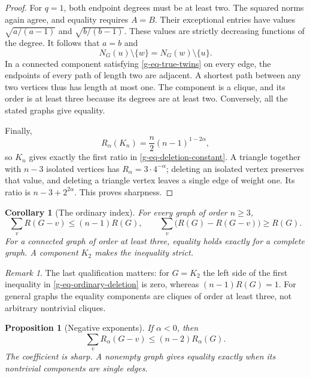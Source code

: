 \documentclass[11pt,a4paper]{article}
\newtheorem{proposition}[theorem]{Proposition}
\newtheorem{corollary}[theorem]{Corollary}
\theoremstyle{definition}
\theoremstyle{remark}
\newtheorem{remark}[theorem]{Remark}
\begin{document}
\begin{proof}
For $q=1$, both endpoint degrees must be at least two.  The squared norms
again agree, and equality requires $A=B$.  Their exceptional entries have
values $\sqrt{a/(a-1)}$ and $\sqrt{b/(b-1)}$.  These values are strictly
decreasing functions of the degree.  It follows that $a=b$ and
\begin{equation}
 N_G(u)\setminus\{w\}=N_G(w)\setminus\{u\}.
 \label{g-eq-true-twins}
\end{equation}
In a connected component satisfying \eqref{g-eq-true-twins} on every edge,
the endpoints of every path of length two are adjacent.  A shortest path
between any two vertices thus has length at most one.  The component is a
clique, and its order is at least three because its degrees are at least
two.  Conversely, all the stated graphs give equality.

Finally,
\[
 R_\alpha(K_n)=\frac n2(n-1)^{1-2\alpha},
\]
so $K_n$ gives exactly the first ratio in
\eqref{g-eq-deletion-constant}.  A triangle together with $n-3$ isolated
vertices has $R_\alpha=3\cdot4^{-\alpha}$; deleting an isolated vertex
preserves that value, and deleting a triangle vertex leaves a single edge
of weight one.  Its ratio is $n-3+2^{2\alpha}$.  This proves sharpness.
\end{proof}

\begin{corollary}[The ordinary index]
\label{g-cor-ordinary-deletion}
For every graph of order $n\ge3$,
\begin{equation}
 \sum_vR(G-v)\le(n-1)R(G),\qquad
 \sum_v\bigl(R(G)-R(G-v)\bigr)\ge R(G).
 \label{g-eq-ordinary-deletion}
\end{equation}
For a connected graph of order at least three, equality holds exactly for
a complete graph.  A component $K_2$ makes the inequality strict.
\end{corollary}

\begin{remark}
The last qualification matters: for $G=K_2$ the left side of the first
inequality in \eqref{g-eq-ordinary-deletion} is zero, whereas
$(n-1)R(G)=1$.  For general graphs the equality components are cliques of
order at least three, not arbitrary nontrivial cliques.
\end{remark}

\begin{proposition}[Negative exponents]
\label{g-prop-negative-deletion}
If $\alpha<0$, then
\[
 \sum_vR_\alpha(G-v)\le(n-2)R_\alpha(G).
\]
The coefficient is sharp.  A nonempty graph gives equality exactly when
its nontrivial components are single edges.
\end{proposition}
\end{document}
